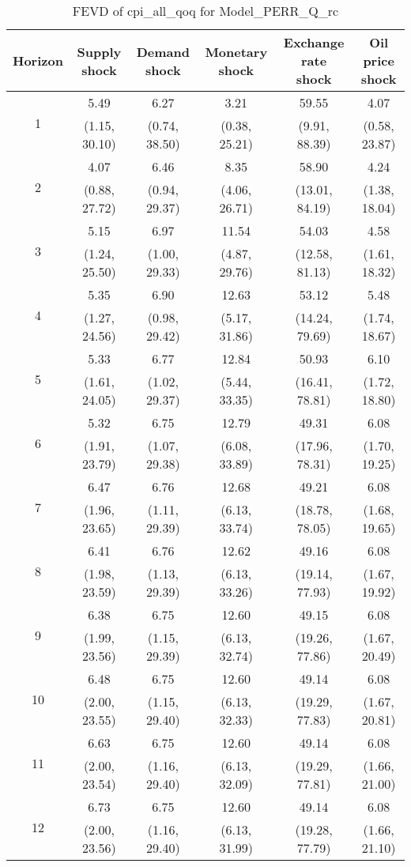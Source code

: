 \documentclass{article}
\begin{document}
\begin{table}
	\footnotesize
	\caption{FEVD of cpi_all_qoq for Model_PERR_Q_rc}
	\begin{tabular}{cccccc}
		Horizon & Supply shock & Demand shock & Monetary shock & Exchange rate shock & Oil price shock\\ \hline
		\multirow{2}{*}{1} & 5.49 & 6.27 & 3.21 & 59.55 & 4.07\\
		 & (1.15, 30.10) & (0.74, 38.50) & (0.38, 25.21) & (9.91, 88.39) & (0.58, 23.87)\\
		\multirow{2}{*}{2} & 4.07 & 6.46 & 8.35 & 58.90 & 4.24\\
		 & (0.88, 27.72) & (0.94, 29.37) & (4.06, 26.71) & (13.01, 84.19) & (1.38, 18.04)\\
		\multirow{2}{*}{3} & 5.15 & 6.97 & 11.54 & 54.03 & 4.58\\
		 & (1.24, 25.50) & (1.00, 29.33) & (4.87, 29.76) & (12.58, 81.13) & (1.61, 18.32)\\
		\multirow{2}{*}{4} & 5.35 & 6.90 & 12.63 & 53.12 & 5.48\\
		 & (1.27, 24.56) & (0.98, 29.42) & (5.17, 31.86) & (14.24, 79.69) & (1.74, 18.67)\\
		\multirow{2}{*}{5} & 5.33 & 6.77 & 12.84 & 50.93 & 6.10\\
		 & (1.61, 24.05) & (1.02, 29.37) & (5.44, 33.35) & (16.41, 78.81) & (1.72, 18.80)\\
		\multirow{2}{*}{6} & 5.32 & 6.75 & 12.79 & 49.31 & 6.08\\
		 & (1.91, 23.79) & (1.07, 29.38) & (6.08, 33.89) & (17.96, 78.31) & (1.70, 19.25)\\
		\multirow{2}{*}{7} & 6.47 & 6.76 & 12.68 & 49.21 & 6.08\\
		 & (1.96, 23.65) & (1.11, 29.39) & (6.13, 33.74) & (18.78, 78.05) & (1.68, 19.65)\\
		\multirow{2}{*}{8} & 6.41 & 6.76 & 12.62 & 49.16 & 6.08\\
		 & (1.98, 23.59) & (1.13, 29.39) & (6.13, 33.26) & (19.14, 77.93) & (1.67, 19.92)\\
		\multirow{2}{*}{9} & 6.38 & 6.75 & 12.60 & 49.15 & 6.08\\
		 & (1.99, 23.56) & (1.15, 29.39) & (6.13, 32.74) & (19.26, 77.86) & (1.67, 20.49)\\
		\multirow{2}{*}{10} & 6.48 & 6.75 & 12.60 & 49.14 & 6.08\\
		 & (2.00, 23.55) & (1.15, 29.40) & (6.13, 32.33) & (19.29, 77.83) & (1.67, 20.81)\\
		\multirow{2}{*}{11} & 6.63 & 6.75 & 12.60 & 49.14 & 6.08\\
		 & (2.00, 23.54) & (1.16, 29.40) & (6.13, 32.09) & (19.29, 77.81) & (1.66, 21.00)\\
		\multirow{2}{*}{12} & 6.73 & 6.75 & 12.60 & 49.14 & 6.08\\
		 & (2.00, 23.56) & (1.16, 29.40) & (6.13, 31.99) & (19.28, 77.79) & (1.66, 21.10)\\
	\end{tabular}
\label{tab:fevd-Model_PERR_Q_rc-cpi_all_qoq}
\end{table}
\end{document}
